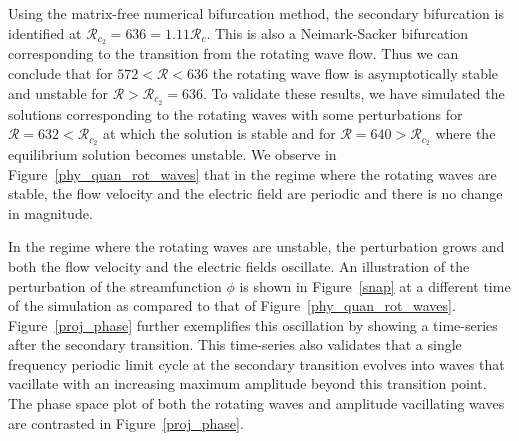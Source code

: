 Using the matrix-free numerical bifurcation method, the secondary bifurcation is identified at $\mathcal{R}_{c_2} = 636 = 1.11\mathcal{R}_c$. This is also a Neimark-Sacker bifurcation corresponding to the transition from the rotating wave flow. Thus we can conclude that for $ 572 < \mathcal{R} < 636$ the rotating wave flow is asymptotically stable and unstable for $\mathcal{R} > \mathcal{R}_{c_2} = 636$. To validate these results, we have simulated the solutions corresponding to the rotating waves with some perturbations for $\mathcal{R} = 632 < \mathcal{R}_{c_2}$ at which the solution is stable and for $\mathcal{R} = 640 > \mathcal{R}_{c_2}$ where the equilibrium solution becomes unstable.
We observe in Figure~\ref{phy_quan_rot_waves} that in the regime where the rotating waves are stable, the flow velocity and the electric field are periodic and there is no change in magnitude.

In the regime where the rotating waves are unstable, the perturbation grows and both the flow velocity and the electric fields oscillate. An illustration of the perturbation of the streamfunction $\phi$ is shown in Figure~\ref{snap} at a different time of the simulation as compared to that of Figure~\ref{phy_quan_rot_waves}. Figure~\ref{proj_phase} further exemplifies this oscillation by showing a time-series after the secondary transition. This time-series also validates that a single frequency periodic limit cycle at the secondary transition evolves into waves that vacillate with an increasing maximum amplitude beyond this transition point. The phase space plot of both the rotating waves and amplitude vacillating waves are contrasted in Figure~\ref{proj_phase}.

